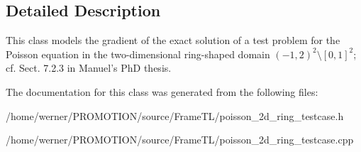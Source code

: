 \subsection{Detailed Description}
This class models the gradient of the exact solution of a test problem for the Poisson equation in the two-dimensional ring-shaped domain $(-1,2)^2\setminus [0,1]^2$; cf. Sect. 7.2.3 in Manuel's PhD thesis. 

The documentation for this class was generated from the following files:\begin{CompactItemize}
\item 
/home/werner/PROMOTION/source/FrameTL/poisson\_\-2d\_\-ring\_\-testcase.h\item 
/home/werner/PROMOTION/source/FrameTL/poisson\_\-2d\_\-ring\_\-testcase.cpp\end{CompactItemize}
